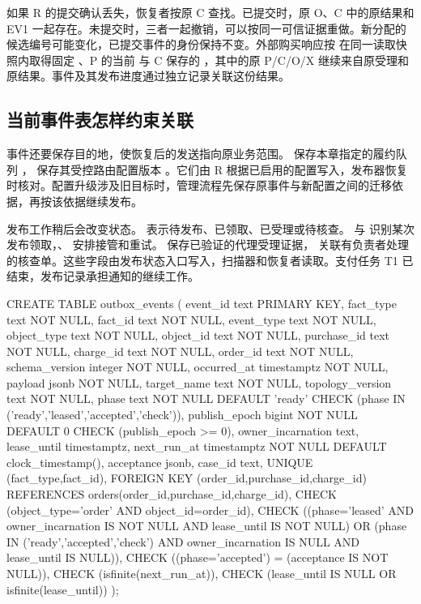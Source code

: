 如果 R 的提交确认丢失，恢复者按原 C 查找。已提交时，原 O、C 中的原结果和 EV1 一起存在。未提交时，三者一起撤销，可以按同一可信证据重做。新分配的候选编号可能变化，已提交事件的身份保持不变。外部购买响应按  在同一读取快照内取得固定 、P 的当前  与 C 保存的 ，其中的原 P/C/O/X 继续来自原受理和原结果。事件及其发布进度通过独立记录关联这份结果。

\subsection*{当前事件表怎样约束关联}

事件还要保存目的地，使恢复后的发送指向原业务范围。 保存本章指定的履约队列 ， 保存其受控路由配置版本 。它们由 R 根据已启用的配置写入，发布器恢复时核对。配置升级涉及旧目标时，管理流程先保存原事件与新配置之间的迁移依据，再按该依据继续发布。

发布工作稍后会改变状态。 表示待发布、已领取、已受理或待核查。 与  识别某次发布领取，、 安排接管和重试。 保存已验证的代理受理证据， 关联有负责者处理的核查单。这些字段由发布状态入口写入，扫描器和恢复者读取。支付任务 T1 已结束，发布记录承担通知的继续工作。

\begin{BookCode}
CREATE TABLE outbox_events (
  event_id text PRIMARY KEY,
  fact_type text NOT NULL, fact_id text NOT NULL,
  event_type text NOT NULL,
  object_type text NOT NULL, object_id text NOT NULL,
  purchase_id text NOT NULL, charge_id text NOT NULL,
  order_id text NOT NULL,
  schema_version integer NOT NULL,
  occurred_at timestamptz NOT NULL, payload jsonb NOT NULL,
  target_name text NOT NULL, topology_version text NOT NULL,
  phase text NOT NULL DEFAULT 'ready'
    CHECK (phase IN ('ready','leased','accepted','check')),
  publish_epoch bigint NOT NULL DEFAULT 0 CHECK (publish_epoch >= 0),
  owner_incarnation text, lease_until timestamptz,
  next_run_at timestamptz NOT NULL DEFAULT clock_timestamp(),
  acceptance jsonb, case_id text,
  UNIQUE (fact_type,fact_id),
  FOREIGN KEY (order_id,purchase_id,charge_id)
    REFERENCES orders(order_id,purchase_id,charge_id),
  CHECK (object_type='order' AND object_id=order_id),
  CHECK ((phase='leased' AND owner_incarnation IS NOT NULL
                          AND lease_until IS NOT NULL)
    OR (phase IN ('ready','accepted','check')
        AND owner_incarnation IS NULL AND lease_until IS NULL)),
  CHECK ((phase='accepted') = (acceptance IS NOT NULL)),
  CHECK (isfinite(next_run_at)),
  CHECK (lease_until IS NULL OR isfinite(lease_until))
);
\end{BookCode}

